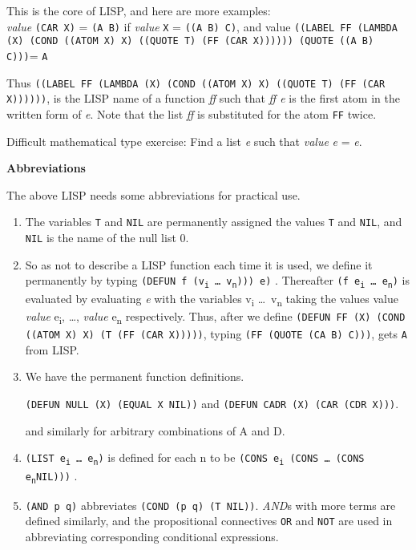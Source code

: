 \documentclass[8pt,letter,twocolumn]{article}
\newcommand{\args}[1] {#1\textsubscript{i} \dots \ #1\textsubscript{n}}
\newcommand{\ei}[0] {e\textsubscript{i}}
\newcommand{\en}[0] {e\textsubscript{n}}
\begin{document}
This is the core of LISP, and here are more examples:  \\

\textit{value} \texttt{(CAR X)} = \texttt{(A B)} if \textit{value} \texttt{X} =
\texttt{((A B) C)}, and value \texttt{((LABEL FF (LAMBDA (X) (COND ((ATOM X) X)
  ((QUOTE T) (FF (CAR X)))))) (QUOTE ((A B) C)))}= \texttt{A}

Thus \texttt{((LABEL FF (LAMBDA (X) (COND ((ATOM X) X) ((QUOTE T) (FF (CAR
  X))))))}, is the LISP name of a function \textit{ff} such that \textit{ff e}
is the first atom in the written form of \textit{e}. Note that the list
\textit{ff} is substituted for the atom \texttt{FF} twice.

Difficult mathematical type exercise: Find a list \textit{e} such that
\textit{value} \textit{e} = \textit{e}.

\vspace*{1\baselineskip}
\textbf{Abbreviations}
\vspace*{1\baselineskip}

The above LISP needs some abbreviations for practical use.

\begin{enumerate}
\setlength\itemsep{0em}

\item The variables \texttt{T} and \texttt{NIL} are permanently assigned the
  values \texttt{T} and \texttt{NIL}, and \texttt{NIL} is the name of the null
  list 0.

\item So as not to describe a LISP function each time it is used, we define it
  permanently by typing \texttt{(DEFUN f (\args{v}))) e)} . Thereafter
  \texttt{(f \args{e})} is evaluated by evaluating \textit{e} with the variables
  \args{v} taking the values value \textit{value} \ei, \dots, \textit{value} \en
  respectively. Thus, after we define \texttt{(DEFUN FF (X) (COND ((ATOM X) X)
    (T (FF (CAR X)))))}, typing \texttt{(FF (QUOTE (CA B) C)))}, gets \texttt{A}
  from LISP.

\item We have the permanent function definitions.

  \texttt{(DEFUN NULL (X) (EQUAL X NIL))} and \texttt{(DEFUN CADR (X) (CAR (CDR
    X)))}.

  and similarly for arbitrary combinations of A and D.

\item \texttt{(LIST \args{e})} is defined for each n to be \texttt{(CONS \ei
    (CONS \dots \ (CONS \en NIL)))} .

\item \texttt{(AND p q)} abbreviates \texttt{(COND (p q) (T NIL))}.
  \textit{AND}s with more terms are defined similarly, and the propositional
  connectives \texttt{OR} and \texttt{NOT} are used in abbreviating
  corresponding conditional expressions.

\end{enumerate}
\end{document}
